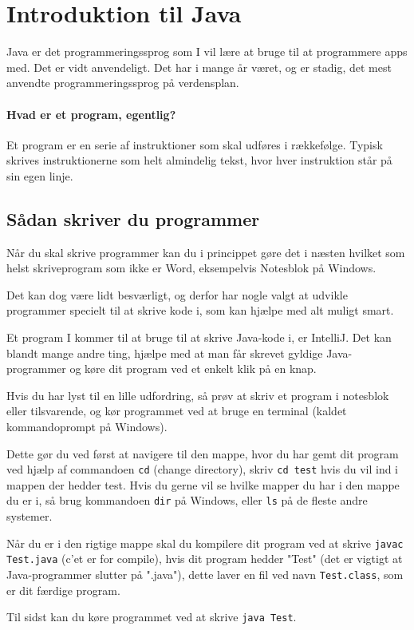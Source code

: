\chapter{Introduktion til Java}
Java er det programmeringssprog som I vil lære at bruge til at programmere apps med. Det er vidt anvendeligt. Det har i mange år været, og er stadig, det mest anvendte programmeringssprog på verdensplan.

\subsubsection{Hvad er et program, egentlig?}
Et program er en serie af instruktioner som skal udføres i rækkefølge. Typisk skrives instruktionerne som helt almindelig tekst, hvor hver instruktion står på sin egen linje.

\section{Sådan skriver du programmer}
Når du skal skrive programmer kan du i princippet gøre det i næsten hvilket som helst skriveprogram som ikke er Word, eksempelvis Notesblok på Windows. 

Det kan dog være lidt besværligt, og derfor har nogle valgt at udvikle programmer specielt til at skrive kode i, som kan hjælpe med alt muligt smart. 

Et program I kommer til at bruge til at skrive Java-kode i, er IntelliJ. Det kan blandt mange andre ting, hjælpe med at man får skrevet gyldige Java-programmer og køre dit program ved et enkelt klik på en knap.

\begin{remark}
	Hvis du har lyst til en lille udfordring, så prøv at skriv et program i notesblok eller tilsvarende, og kør programmet ved at bruge en terminal (kaldet kommandoprompt på Windows). 
	
	Dette gør du ved først at navigere til den mappe, hvor du har gemt dit program ved hjælp af commandoen \texttt{cd} (change directory), skriv \texttt{cd test} hvis du vil ind i mappen der hedder test. Hvis du gerne vil se hvilke mapper du har i den mappe du er i, så brug kommandoen \texttt{dir} på Windows, eller \texttt{ls} på de fleste andre systemer. 
	
	Når du er i den rigtige mappe skal du kompilere dit program ved at skrive \texttt{javac Test.java} (c'et er for compile), hvis dit program hedder "Test" (det er vigtigt at Java-programmer slutter på ".java"), dette laver en fil ved navn \texttt{Test.class}, som er dit færdige program. 
	
	Til sidst kan du køre programmet ved at skrive \texttt{java Test}.
\end{remark}


